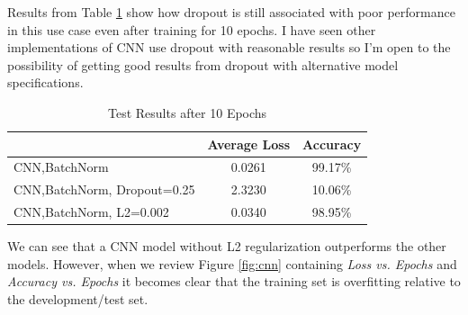 \documentclass[a4paper,12pt]{article} %
\begin{document}
Results from Table \ref{table:results} show how dropout is still associated
with poor performance in this use case even after training for 10 epochs.
I have seen other implementations of CNN use dropout with reasonable
results so I'm open to the possibility of getting good results from dropout
with alternative model specifications. \newline

\begin{table}[ht]
\centering
\caption{Test Results after 10 Epochs}
\label{table:results}
\begin{tabular}[t]{lcc} 
\toprule
&Average Loss & Accuracy\\
\midrule
CNN,BatchNorm               & 0.0261 & 99.17\% \\
CNN,BatchNorm, Dropout=0.25 & 2.3230 & 10.06\% \\
CNN,BatchNorm, L2=0.002     & 0.0340 & 98.95\% \\
\bottomrule
\end{tabular}
\end{table}

We can see that a CNN model without L2 regularization outperforms the
other models. However, when we review Figure \ref{fig:cnn} containing
\textit{Loss vs. Epochs} and \textit{Accuracy vs. Epochs} it becomes
clear that the training set is overfitting relative to the development/test
set. 
\end{document}
